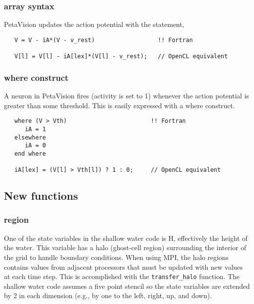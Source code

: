 \documentclass[10pt, conference, compsocconf]{IEEEtran}
\begin{document}
\subsubsection{array syntax}

PetaVision updates the action potential with the statement,

\begin{verbatim}
   V = V - iA*(V - v_rest)                  !! Fortran

   V[l] = V[l] - iA[lex]*(V[l] - v_rest);   // OpenCL equivalent
\end{verbatim}

\subsubsection{where construct}

A neuron in PetaVision fires (activity is set to 1)
whenever the action potential is greater than some threshold.
This is easily expressed with a where construct.

\begin{verbatim}
   where (V > Vth)                        !! Fortran
      iA = 1
   elsewhere
      iA = 0
   end where

   iA[lex] = (V[l] > Vth[l]) ? 1 : 0;     // OpenCL equivalent
\end{verbatim}

\subsection{New functions}

\subsubsection{region}

One of the state variables in the shallow water code is H, effectively the
height of the water.  This variable has a halo (ghost-cell region) surrounding
the interior of the grid to handle boundary conditions.  When using
MPI, the halo regions contains values from adjacent processors that must be
updated with new values at each time step.  This is accomplished with the
{\tt transfer\_halo} function.  The shallow water code assumes a five point stencil
so the state variables are extended by 2 in each dimension (e.g., by one to the
left, right, up, and down).
\end{document}
